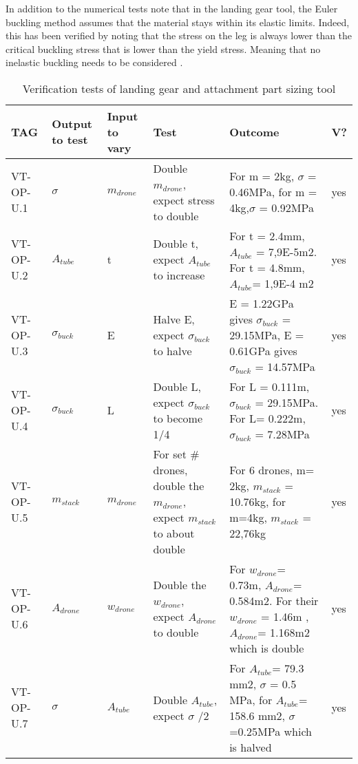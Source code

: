 In addition to the numerical tests note that in the landing gear tool, the Euler buckling method assumes that the material stays within its elastic limits. Indeed, this has been verified by noting that the stress on the leg is always lower than the critical buckling stress that is lower than the yield stress. Meaning that no inelastic buckling needs to be considered \cite{SAD}.


\begin{longtable}[c]{|p{1.25cm}|p{1.25cm}|p{1.25cm}|p{4.5cm}|p{5.5cm}|p{0.5cm}|}
\caption{Verification tests of landing gear and attachment part sizing tool}
\label{tab:unitVerifLG}\\
\hline
\textbf{TAG} & \textbf{Output to test} & \textbf{Input to vary} & \textbf{Test} & \textbf{Outcome} & \textbf{V?} \\ \hline
\endfirsthead
%
\endhead
%
VT-OP-U.1 & $\sigma$ & $m_{drone}$ & Double $m_{drone}$, expect stress to double & For m = 2kg, $\sigma$ = 0.46MPa, for m = 4kg,$\sigma$ = 0.92MPa & \cellcolor[HTML]{C1FFC1} yes \\ \hline
VT-OP-U.2 & $A_{tube}$ & t & Double t, expect $A_{tube}$ to increase & For t = 2.4mm, $A_{tube}$ = 7,9E-5m2. For t = 4.8mm, $A_{tube}$= 1,9E-4 m2 & \cellcolor[HTML]{C1FFC1} yes \\ \hline
VT-OP-U.3 & $\sigma_{buck}$ & E & Halve E, expect $\sigma_{buck}$ to halve & E = 1.22GPa gives $\sigma_{buck}$ = 29.15MPa,  E = 0.61GPa gives $\sigma_{buck}$ = 14.57MPa & \cellcolor[HTML]{C1FFC1}yes \\ \hline
VT-OP-U.4 & $\sigma_{buck}$ & L & Double L, expect $\sigma_{buck}$ to become 1/4 & For L = 0.111m, $\sigma_{buck}$ = 29.15MPa. For L= 0.222m, $\sigma_{buck}$ = 7.28MPa & \cellcolor[HTML]{C1FFC1}yes \\ \hline
VT-OP-U.5 & $m_{stack}$ & $m_{drone}$ & For set $\#$ drones, double the $m_{drone}$, expect $m_{stack}$ to about double & For 6 drones, m= 2kg, $m_{stack}$ = 10.76kg, for m=4kg, $m_{stack}$ = 22,76kg & \cellcolor[HTML]{C1FFC1}yes \\ \hline
VT-OP-U.6 & $A_{drone}$ & $w_{drone}$ & Double the $w_{drone}$, expect $A_{drone}$ to double & For $w_{drone}$= 0.73m, $A_{drone}$= 0.584m2.  For their $w_{drone}$ = 1.46m , $A_{drone}$= 1.168m2 which is double & \cellcolor[HTML]{C1FFC1}yes \\ \hline
VT-OP-U.7 & $\sigma$ & $A_{tube}$ & Double $A_{tube}$, expect $\sigma$  /2 & For $A_{tube}$= 79.3 mm2, $\sigma$  = 0.5 MPa, for $A_{tube}$= 158.6 mm2, $\sigma$  =0.25MPa which is halved & \cellcolor[HTML]{C1FFC1}yes \\ \hline

\end{longtable}
